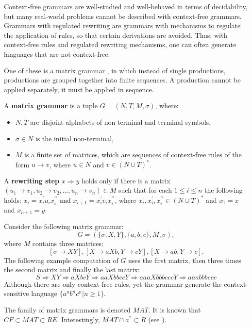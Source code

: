 Context-free grammars are well-studied and well-behaved in terms of decidability, but many real-world problems cannot be described with context-free grammars. Grammars with regulated rewriting are grammars with mechanisms to regulate the application of rules, so that certain derivations are avoided. Thus, with context-free rules and regulated rewriting mechanisms, one can often generate languages that are not context-free.

One of these is a matrix grammar \cite{Dassow12RegulatedRewriting}, in which instead of single productions, productions are grouped together into finite sequences. A production cannot be applied separately, it must be applied in sequence.

\begin{definition}
A  {\bf matrix grammar} is a tuple $G = (N,T,M,\sigma)$, where:
\begin{itemize}
  \item $N, T$ are disjoint alphabets of non-terminal and terminal symbols,
  \item $\sigma\in N$ is the initial non-terminal,
  \item $M$ is a finite set of matrices, which are sequences of context-free rules of the form $u\rightarrow v$, where $u\in N$ and $v\in (N\cup T)^*$.
\end{itemize}
\end{definition}

\begin{definition}
A {\bf rewriting step} $x\Rightarrow y$ holds only if there is a matrix $(u_1\rightarrow v_1, u_2\rightarrow v_2, \ldots, u_n\rightarrow v_n) \in M$ such that for each $1\leq i\leq n$ the following holds: $x_i = x_i^{\prime}u_ix_i^{\prime\prime}$ and $x_{i+1} = x_i^{\prime}v_ix_i^{\prime\prime}$, where $x_i, x_i^{\prime}, x_i^{\prime\prime} \in (N\cup T)^*$ and $x_1 = x$ and $x_{n+1} = y$.
\end{definition}

\begin{example}
Consider the following matrix grammar:
$$G=(\{\sigma, X,Y\}, \{ a,b,c\}, M, \sigma),$$
where $M$ contains three matrices:
$$[\sigma\rightarrow XY], [X\rightarrow aXb, Y\rightarrow cY], [X\rightarrow ab, Y\rightarrow c].$$
The following example computation of $G$ uses the first matrix, then three times the second matrix and finally the last matrix:
$$S\Rightarrow XY\Rightarrow aXbcY\Rightarrow aaXbbccY\Rightarrow aaaXbbbcccY\Rightarrow aaabbbccc$$
Although there are only context-free rules, yet the grammar generate the context-sensitive language $\{a^nb^nc^n|n\geq 1\}$.
\end{example}

The family of matrix grammars is denoted $MAT$. It is known that $CF \subset MAT \subset RE$. Interestingly, $MAT \cap {a}^* \subset R$ (see \cite{Besozzi:PhD:2004}).
